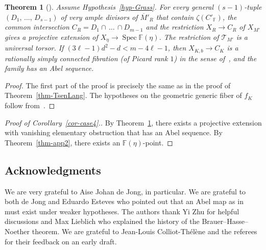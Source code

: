 \documentclass[11pt]{article}
\newtheorem{theo}{Theorem}[section]
\theoremstyle{definition}
\numberwithin{equation}{section}
\numberwithin{figure}{section}
\numberwithin{table}{section}
\newcommand{\mbb}{\mathbb}
\newcommand{\FF}{\mbb{F}}
\newcommand{\mc}{\mathcal}
\newcommand{\mcT}{\mc{T}}
\newcommand{\ol}{\overline}
\newcommand{\Xx}{X}
\newcommand{\Cc}{C}
\newcommand{\FR}{K}
\newcommand{\cb}{b}
\DeclareMathOperator{\SP}{Spec}
\begin{document}
\begin{theo}[{\cite{dJHS, Findley}}]\label{thm-Grass}
Assume Hypothesis~\ref{hyp-Grass}. For every general $(s-1)$-tuple $(D_1,\,\dots,\,D_{s-1})$ of very ample divisors of $\ol{M}'_R$ that contain $\zeta(\Cc'_{\FF})$, the common intersection $\Cc_R = D_1\cap \,\dots\,\cap D_{m-1}$ and the restriction $\Xx_{R} \to \Cc_R$ of $\Xx_{M'}$ gives a projective extension of $X_\eta \to \SP \FF(\eta)$. The restriction of $\mcT_{M'}$ is a universal torsor. If $(3\ell -1)d^2 -d < m-4\ell-1$, then $\Xx_{\FR,\cb}\to \Cc_{\FR}$ is a rationally simply connected fibration (of Picard rank $1$) in the sense of~\cite[Theorem~13.1]{dJHS}, and the family has an Abel sequence.
\end{theo}

\begin{proof}
The first part of the proof is precisely the same as in the proof of Theorem~\ref{thm-TsenLang}. The hypotheses on the geometric generic fiber of $f_\FR$ follow from~\cite[Theorem~1.8]{Findley}.
\end{proof}


\begin{proof}[Proof of Corollary~\ref{cor-case4}.]
By Theorem~\ref{thm-Grass}, there exists a projective extension with vanishing elementary obstruction that has an Abel sequence. By Theorem~\ref{thm-app2}, there exists an $\FF(\eta)$-point.
\end{proof}

\subsection*{Acknowledgments}
We are very grateful to Aise Johan de Jong, in particular. We are grateful to both de Jong and Eduardo Esteves who pointed out that an Abel map as in~\cite{dJHS} must exist under weaker hypotheses. The authors thank Yi Zhu for helpful discussions and Max Lieblich who explained the history of the Brauer--Hasse--Noether theorem. We are grateful to Jean-Louis Colliot-Thélène and the referees for their feedback on an early draft.
\end{document}
